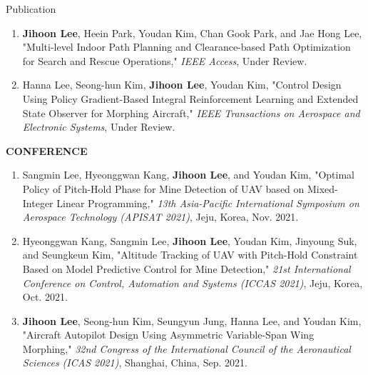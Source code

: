 \documentclass{resume}
\begin{document}
\begin{rSection}{Publication}
\begin{enumerate}
		\color{gray}

		\item \textbf{\color{coolblack}Jihoon Lee}, Heein Park, Youdan Kim, Chan Gook Park, and Jae Hong Lee, "Multi-level Indoor Path Planning and Clearance-based Path Optimization for Search and Rescue Operations," \textit{IEEE Access}, Under Review.
		
		\item Hanna Lee, Seong-hun Kim, \textbf{\color{coolblack}Jihoon Lee}, Youdan Kim, "Control Design Using Policy Gradient-Based Integral Reinforcement Learning and Extended State Observer for Morphing Aircraft," \textit{IEEE Transactions on Aerospace and Electronic Systems}, Under Review.
	\end{enumerate}\renewcommand{\labelenumi}{\theenumi.}
	
	\textbf{CONFERENCE}
	\begin{enumerate}\renewcommand{\labelenumi}{[C\theenumi]}
		
		\item Sangmin Lee, Hyeonggwan Kang, \textbf{\color{coolblack}Jihoon Lee}, and Youdan Kim, "Optimal Policy of Pitch-Hold Phase for Mine Detection of UAV based on Mixed-Integer Linear Programming," \textit{13th Asia-Pacific International Symposium on Aerospace Technology (APISAT 2021)}, Jeju, Korea, Nov. 2021. 
				
		\item Hyeonggwan Kang, Sangmin Lee, \textbf{\color{coolblack}Jihoon Lee}, Youdan Kim, Jinyoung Suk, and Seungkeun Kim, "Altitude Tracking of UAV with Pitch-Hold Constraint Based on Model Predictive Control for Mine Detection," \textit{21st International Conference on Control, Automation and Systems (ICCAS 2021)}, Jeju, Korea, Oct. 2021. 
		
		\item \textbf{\color{coolblack}Jihoon Lee}, Seong-hun Kim, Seungyun Jung, Hanna Lee, and Youdan Kim, "Aircraft Autopilot Design Using Asymmetric Variable-Span Wing Morphing," \textit{32nd Congress of the International Council of the Aeronautical Sciences (ICAS 2021)}, Shanghai, China, Sep. 2021. 
		

\end{enumerate}
\end{rSection}
\end{document}
